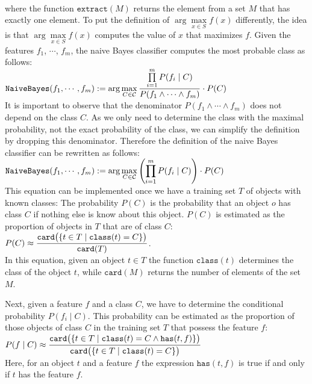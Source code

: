 \\[0.2cm]
where the function $\texttt{extract}(M)$ returns the element from a set $M$ that has exactly one element.  To
put the definition of  $\arg\max\limits_{x \in S} f(x)$ differently, the idea is that
$\arg\max\limits_{x \in S} f(x)$ computes the value of $x$ that maximizes $f$.  Given the features  $f_1$, $\cdots$,
$f_m$, the naive Bayes classifier computes the most probable class as follows:
\\[0.2cm]
\hspace*{1.3cm}
$\displaystyle \texttt{NaiveBayes}(f_1,\cdots,f_m) :=
  \arg\max\limits_{C \in \mathcal{C}}  \frac{\prod\limits_{i=1}^m P(f_i \;|\; C)}{P(f_1 \wedge \cdots \wedge f_m)} \cdot P(C) 
$
\\[0.2cm]
It is important to observe that the denominator $P(f_1 \wedge \cdots \wedge f_m)$ does not depend on the class
$C$.  As we only need to determine the class with the maximal probability, not the exact probability of the
class, we can simplify the definition by dropping this denominator.  Therefore the definition of the naive
Bayes classifier can be rewritten as follows:
\\[0.2cm]
\hspace*{1.3cm}
$\displaystyle \texttt{NaiveBayes}(f_1,\cdots,f_m) :=
  \arg\max\limits_{C \in \mathcal{C}}  \left(\prod\limits_{i=1}^m P(f_i \;|\; C)\right) \cdot P(C) 
$
\\[0.2cm]
This equation can be implemented once we have a training set $T$ of objects with known classes:  
The probability $P(C)$ is the probability that an object $o$ has class $C$
if nothing else is know about this object.  $P(C)$ is estimated as the proportion of objects in $T$ that are
of class $C$:
\\[0.2cm]
\hspace*{1.3cm}
$ \displaystyle P(C) \approx \frac{\texttt{card}\bigl(\{t \in T \;|\; \texttt{class}(t) = C \}\bigr)}{\texttt{card}(T)}$.
\\[0.2cm]
In this equation, given an object $t\in T$ the function $\texttt{class}(t)$ determines the class of the object
$t$, while $\texttt{card}(M)$ returns the number of elements of the set $M$.

Next, given a feature $f$ and a class $C$, we have to determine the conditional probability $P(f_i \;|\; C)$.
This probability can be estimated as the proportion of those objects of class $C$ in the training set $T$ that
possess the feature $f$:
\\[0.2cm]
\hspace*{1.3cm}
$\displaystyle P(f\;|\;C) \approx 
 \frac{\texttt{card}\bigl(\{t \in T \;|\; \texttt{class}(t) = C \wedge \texttt{has}(t, f) \}\bigr)}{
       \texttt{card}\bigl(\{t \in T \;|\; \texttt{class}(t) = C \}\bigr)} 
$
\\[0.2cm]
Here, for an object $t$ and a feature $f$ the expression $\texttt{has}(t, f)$ is true if and only if $t$ has
the feature $f$.

